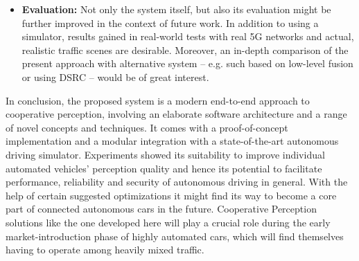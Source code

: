 \begin{itemize}
	\item \textbf{Evaluation:} Not only the system itself, but also its evaluation might be further improved in the context of future work. In addition to using a simulator, results gained in real-world tests with real 5G networks and actual, realistic traffic scenes are desirable. Moreover, an in-depth comparison of the present approach with alternative system – e.g. such based on low-level fusion or using DSRC – would be of great interest.
\end{itemize}
\par
\bigskip

In conclusion, the proposed system is a modern end-to-end approach to cooperative perception, involving an elaborate software architecture and a range of novel concepts and techniques. It comes with a proof-of-concept implementation and a modular integration with a state-of-the-art autonomous driving simulator. Experiments showed its suitability to improve individual automated vehicles' perception quality and hence its potential to facilitate performance, reliability and security of autonomous driving in general. With the help of certain suggested optimizations it might find its way to become a core part of connected autonomous cars in the future. Cooperative Perception solutions like the one developed here will play a crucial role during the early market-introduction phase of highly automated cars, which will find themselves having to operate among heavily mixed traffic. 
